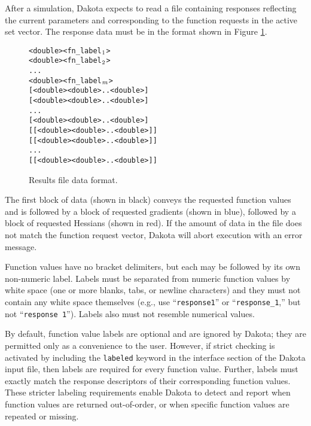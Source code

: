 After a simulation, Dakota expects to read a file
containing responses reflecting the current parameters and
corresponding to the function requests in the active
set vector. The response data must be in the format
shown in Figure \ref{responses:figure01}.

\begin{figure}
  \centering
  \begin{bigbox}
  \begin{alltt}
    <double> <fn_label\(\sb{1}\)>
    <double> <fn_label\(\sb{2}\)>
    ...
    <double> <fn_label\(\sb{m}\)> \color{blue}
    [ <double> <double> .. <double> ]
    [ <double> <double> .. <double> ]
    ...
    [ <double> <double> .. <double> ] \color{red}
    [[ <double> <double> .. <double> ]]
    [[ <double> <double> .. <double> ]]
    ...
    [[ <double> <double> .. <double> ]]
  \end{alltt}
  \end{bigbox}
  \caption{Results file data format.}
  \label{responses:figure01}
\end{figure}

The first block of data (shown in black) conveys the requested function values
and is followed by a block of requested gradients
(shown in blue), followed by a block of requested Hessians (shown
in red). If the amount of data in the file does not match the function
request vector, Dakota will abort execution with an error message.

Function values have no bracket delimiters, but each may be followed by its own
non-numeric label. Labels must be separated from numeric function 
values by white space (one or more blanks, tabs, or newline characters) and they must 
not contain any white space themselves (e.g., use ``\texttt{response1}'' or ``\texttt{response\_1},'' 
but not ``\texttt{response 1}''). Labels also must not resemble numerical values.

By default, function value labels are optional and are ignored by Dakota; they are 
permitted only as a convenience to the user. However, if strict checking is activated
by including the \texttt{labeled} keyword in the interface section of the Dakota input
file, then labels are required for every function value. Further, labels must 
exactly match the response descriptors of their corresponding function values. These 
stricter labeling requirements enable Dakota to detect and report when function values 
are returned out-of-order, or when specific function values are repeated or missing.

